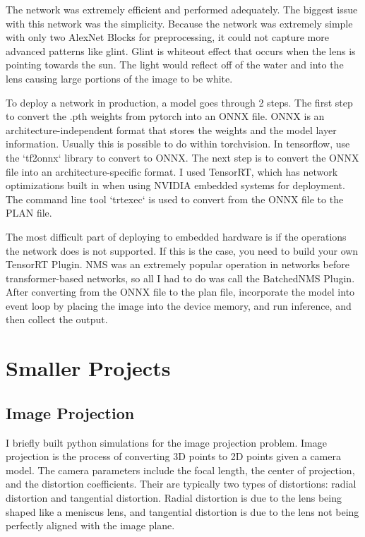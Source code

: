 \documentclass[12pt]{article}
\begin{document}
The network was extremely efficient and performed adequately. The biggest issue with this network was  the simplicity. Because the network was extremely simple with only two AlexNet Blocks for preprocessing, it could not capture more advanced patterns like glint. Glint is whiteout effect that occurs when the lens is pointing towards the sun. The light would reflect off of the water and into the lens causing large portions of the image to be white.

To deploy a network in production, a model goes through 2 steps. The first step to convert the .pth weights from pytorch into an ONNX file. \cite{metaTorchonnxDocumentation} ONNX is an architecture-independent format that stores the weights and the model layer information. Usually this is possible to do within torchvision. In tensorflow, use the `tf2onnx` library to convert to ONNX. \cite{Tensorflowonnx2024} The next step is to convert the ONNX file into an architecture-specific format. I used TensorRT, which has network optimizations built in when using NVIDIA embedded systems for deployment. \cite{NVIDIATensorRT2024} The command line tool `trtexec` is used to convert from the ONNX file to the PLAN file.

The most difficult part of deploying to embedded hardware is if the operations the network does is not supported. If this is the case, you need to build your own TensorRT Plugin. NMS was an extremely popular operation in networks before transformer-based networks, so all I had to do was call the BatchedNMS Plugin. \cite{TensorRTPluginBatchedNMSPlugin} After converting from the ONNX file to the plan file, incorporate the model into event loop by placing the image into the device memory, and run inference, and then collect the output.

\section{Smaller Projects}
\subsection{Image Projection}
I briefly built python simulations for the image projection problem. Image projection is the process of converting 3D points to 2D points given a camera model. The camera parameters include the focal length, the center of projection, and the distortion coefficients. Their are typically two types of distortions: radial distortion and tangential distortion. Radial distortion is due to the lens being shaped like a meniscus lens, and tangential distortion is due to the lens not being perfectly aligned with the image plane. 
\end{document}
